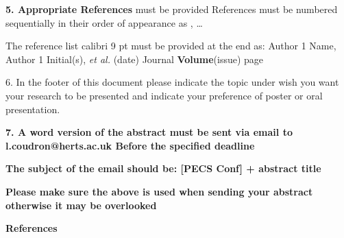 \documentclass[british]{article}
\begin{document}
\textbf{5. Appropriate References} must be provided References must be numbered sequentially in their order of appearance as \cite{article1}, \cite{article2}…

The reference list calibri 9 pt must be provided at the end as: \cite{article1} Author 1 Name, Author 1 Initial(s), \textit{et al.} (date) Journal \textbf{Volume}(issue) page

6. In the footer of this document please indicate the topic under wish you want your research to be presented and indicate your preference of poster or oral presentation. 

\textbf{7. A word version of the abstract must be sent via email to l.coudron@herts.ac.uk Before the specified deadline}

\textbf{The subject of the email should be: [PECS Conf] + abstract title}

\textbf{Please make sure the above is used when sending your abstract otherwise it may be overlooked }


\vspace{3mm}
\textbf{References}
\printbibliography[heading=none]


\end{document}
